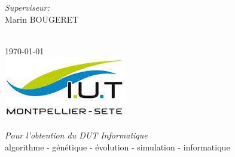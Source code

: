 \documentclass{article}
\begin{document}
\begin{titlepage}
\begin{minipage}{0.4\textwidth}
\end{minipage}
\begin{minipage}{0.4\textwidth}
\begin{flushright} \large
\emph{Superviseur:} \\
Marin \textsc{BOUGERET} %
\end{flushright}
\end{minipage}\\[1cm]


{\large \today}\\[1cm] %
\includegraphics{.ressources/logo.jpeg}%

\begin{minipage}{0.8\textwidth}
\begin{center}
\emph{Pour l'obtention du DUT Informatique} \\
algorithme - génétique - évolution - simulation - informatique
\end{center}
\end{minipage}\\[1cm]

\vfill %
\end{titlepage}

\makeatletter
{}
\makeatother

\tableofcontents
\newpage


\end{document}
